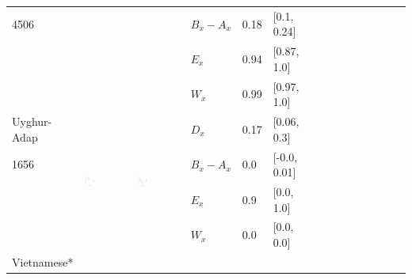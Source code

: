 \documentclass[11pt,letterpaper]{article}
\begin{document}
\begin{longtable}{lllllllllllllll}
4506  &    &    &  $B_x-A_x$  &  0.18  &  [0.1, 0.24]  \\ 
  &    &    &  $E_x$  &  0.94  &  [0.87, 1.0]  \\ 
  &    &    &  $W_x$  &  0.99  &  [0.97, 1.0]  \\ [10.25ex] \hline
Uyghur-Adap  &  \multirow{4}{*}{\includegraphics[width=0.25\textwidth]{figures/Uyghur-Adap-entropy-memory.pdf}}  &  \multirow{4}{*}{\includegraphics[width=0.25\textwidth]{figures/Uyghur-Adap-listener-surprisal-memory.pdf}}  &  $D_x$  &  0.17  &  [0.06, 0.3]  \\ 
1656  &    &    &  $B_x-A_x$  &  0.0  &  [-0.0, 0.01]  \\ 
  &    &    &  $E_x$  &  0.9  &  [0.0, 1.0]  \\ 
  &    &    &  $W_x$  &  0.0  &  [0.0, 0.0]  \\ [10.25ex] \hline
Vietnamese* &\\ [10.25ex] \hline
\end{longtable}
\end{document}
